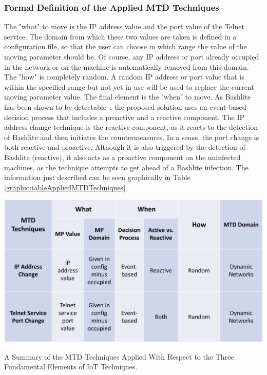 \subsubsection{Formal Definition of the Applied MTD Techniques}
The "what" to move is the IP address value and the port value of the Telnet service. The domain from which these two values are taken is defined in a configuration file, so that the user can choose in which range the value of the moving parameter should be. Of course, any IP address or port already occupied in the network or on the machine is automatically removed from this domain.  
The "how" is completely random. A random IP address or port value that is within the specified range but not yet in use will be used to replace the current moving parameter value. The final element is the "when" to move. As Bashlite has been shown to be detectable~\cite{article:vonderAssen}, the proposed solution uses an event-based decision process that includes a proactive and a reactive component. The IP address change technique is the reactive component, as it reacts to the detection of Bashlite and then initiates the countermeasures. In a sense, the port change is both reactive and proactive. Although it is also triggered by the detection of Bashlite (reactive), it also acts as a proactive component on the uninfected machines, as the technique attempts to get ahead of a Bashlite infection. The information just described can be seen graphically in Table \ref{graphic:tableAppliedMTDTechniques}.

\begin{table}[tph]
\includegraphics[scale=0.7]{assets/tableAppliedMTDTechniques.png}
\centering
\caption{A Summary of the MTD Techniques Applied With Respect to the Three Fundamental Elements of IoT Techniques.}
    \label{graphic:tableAppliedMTDTechniques}
\end{table}



